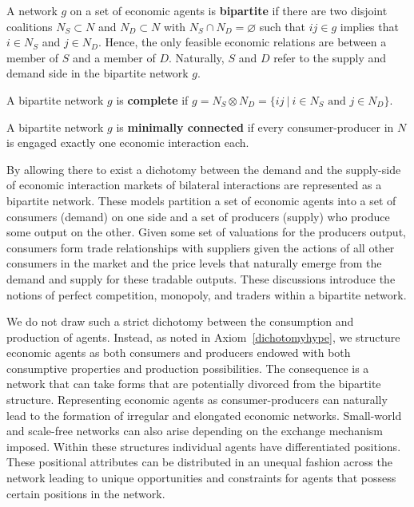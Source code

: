 \begin{definition} \label{def:bipartiteNetworks}
A network $g$ on a set of economic agents is \textbf{bipartite} if there are two disjoint coalitions $N_{S} \subset N$ and $N_{D} \subset N$ with $N_{S} \cap N_{D} = \varnothing$ such that $ij \in g$ implies that $i \in N_{S}$ and $j \in N_{D}$. Hence, the only feasible economic relations are between a member of $S$ and a member of $D$. Naturally, $S$ and $D$ refer to the supply and demand side in the bipartite network $g$.

\noindent A bipartite network $g$ is \textbf{complete} if $g = N_{S} \otimes N_{D} = \{ ij ~ | ~ i \in N_{S} \mbox{ and } j \in N_{D} \}$.

\noindent A bipartite network $g$ is \textbf{minimally connected} if every consumer-producer in $N$ is engaged exactly one economic interaction each.
\end{definition}
By allowing there to exist a dichotomy between the demand and the supply-side of economic interaction markets of bilateral interactions are represented as a bipartite network. These models partition a set of economic agents into a set of consumers (demand) on one side and a set of producers (supply) who produce some output on the other. Given some set of valuations for the producers output, consumers form trade relationships with suppliers given the actions of all other consumers in the market and the price levels that naturally emerge from the demand and supply for these tradable outputs. These discussions introduce the notions of perfect competition, monopoly, and traders within a bipartite network.

We do not draw such a strict dichotomy between the consumption and production of agents. Instead, as noted in Axiom~\ref{dichotomyhype}, we structure economic agents as both consumers and producers endowed with both consumptive properties and production possibilities. The consequence is a network that can take forms that are potentially divorced from the bipartite structure. Representing economic agents as consumer-producers can naturally lead to the formation of irregular and elongated economic networks. Small-world and scale-free networks can also arise depending on the exchange mechanism imposed. Within these structures individual agents have differentiated positions. These positional attributes can be distributed in an unequal fashion across the network leading to unique opportunities and constraints for agents that possess certain positions in the network.

